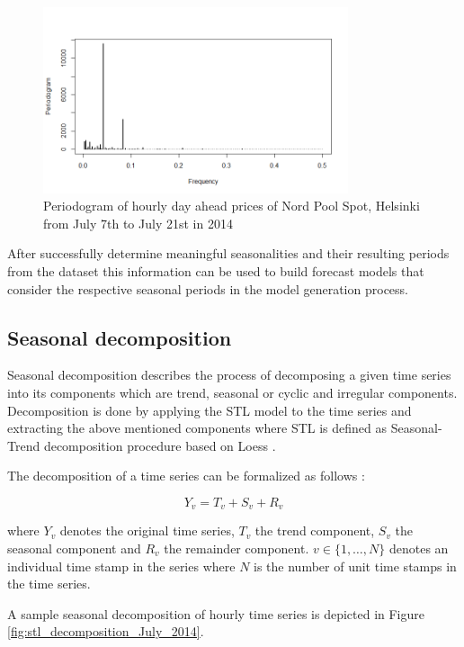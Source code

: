 \begin{figure}[htbp]
	\centering
		\includegraphics[width=0.8\textwidth]{figures/forecasting/periodogram_July_2014.png}
	\caption{Periodogram of hourly day ahead prices of Nord Pool Spot, Helsinki from July 7th to July 21st in 2014}
	\label{fig:periodogram_July_2014}
\end{figure}

After successfully determine meaningful seasonalities and their resulting periods from the dataset this information can be used to build forecast models that consider the respective seasonal periods in the model generation process. 



\subsection{Seasonal decomposition}

Seasonal decomposition describes the process of decomposing a given time series into its components which are trend, seasonal or cyclic and irregular components. Decomposition is done by applying the STL model to the time series and extracting the above mentioned components where STL is defined as Seasonal-Trend decomposition procedure based on Loess \cite{cleveland1990stl}. 

The decomposition of a time series can be formalized as follows \cite{cleveland1990stl}: 

	\[ Y_v = T_v + S_v + R_v \]
	
where $Y_v$ denotes the original time series, $T_v$ the trend component, $S_v$ the seasonal component and $R_v$ the remainder component. $v \in \{ 1,\ldots,N \}$ denotes an individual time stamp in the series where $N$ is the number of unit time stamps in the time series. 

A sample seasonal decomposition of hourly time series is depicted in Figure \ref{fig:stl_decomposition_July_2014}. 

